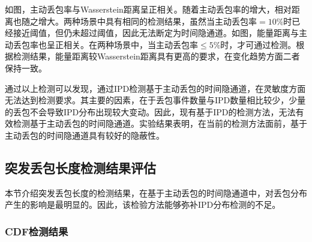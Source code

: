 如图，主动丢包率与Wasserstein距离呈正相关。随着主动丢包率的增大，相对距离也随之增大。两种场景中具有相同的检测结果，虽然当主动丢包率$=10\%$时已经接近阈值，但仍未超过阈值，因此无法断定为时间隐通道。如图，能量距离与主动丢包率也呈正相关。在两种场景中，当主动丢包率$\le 5\%$时，才可通过检测。根据检测结果，能量距离较Wasserstein距离具有更高的要求，在变化趋势方面二者保持一致。

通过以上检测可以发现，通过IPD检测基于主动丢包的时间隐通道，在灵敏度方面无法达到检测要求。其主要的因素，在于丢包事件数量与IPD数量相比较少，少量的丢包不会导致IPD分布出现较大变动。因此，现有基于IPD的检测方法，无法有效检测基于主动丢包的时间隐通道。实验结果表明，在当前的检测方法面前，基于主动丢包的时间隐通道具有较好的隐蔽性。

\subsection{突发丢包长度检测结果评估}
\label{chap:analyze:result:burst}

本节介绍突发丢包长度的检测结果，在基于主动丢包的时间隐通道中，对丢包分布产生的影响是最明显的。因此，该检验方法能够弥补IPD分布检测的不足。

\subsubsection{CDF检测结果}
\label{chap:analyze:result:burst:cdf}


